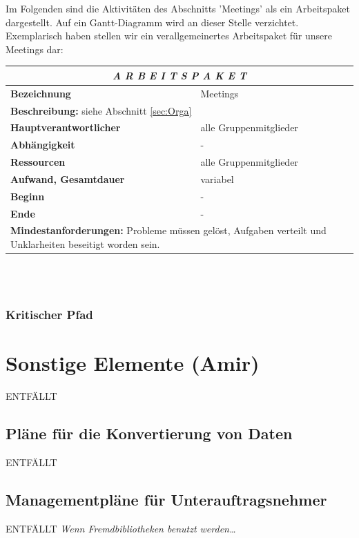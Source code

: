 \documentclass[fontsize=12pt,paper=a4,twoside]{scrartcl}
\begin{document}
Im Folgenden sind die Aktivitäten des Abschnitts 'Meetings' als ein Arbeitspaket dargestellt. Auf ein Gantt-Diagramm wird an dieser Stelle verzichtet.\\

Exemplarisch haben stellen wir ein verallgemeinertes Arbeitspaket für unsere Meetings dar: \\

\begin{tabular}{p{7.5cm}|p{7.5cm}}\toprule
\multicolumn{2}{c}{\textbf{\textit{A R B E I T S P A K E T \quad 8}}} \\ \toprule \hline
\textbf{Bezeichnung} & Meetings\\\hline
\multicolumn{2}{p{15cm}}{\textbf{Beschreibung:} \newline 
siehe Abschnitt \ref{sec:Orga}}  \\\hline
\textbf{Hauptverantwortlicher} & alle Gruppenmitglieder\\\hline
\textbf{Abhängigkeit} & -\\\hline
\textbf{Ressourcen} & alle Gruppenmitglieder\\\hline
\textbf{Aufwand, Gesamtdauer} & variabel  \\\hline
\textbf{Beginn} & - \\\hline
\textbf{Ende} & -\\\hline
\multicolumn{2}{p{15cm}}{\textbf{Mindestanforderungen: } Probleme müssen gelöst, Aufgaben verteilt und Unklarheiten beseitigt worden sein.  \newline
}  \\ \toprule
\end{tabular} \\\\ 

\subsubsection{Kritischer Pfad}\label{aps}

\section{Sonstige Elemente (Amir)}
ENTFÄLLT
\subsection{Pläne für die Konvertierung von Daten}
ENTFÄLLT

\subsection{Managementpläne für Unterauftragsnehmer}
ENTFÄLLT
{\em Wenn Fremdbibliotheken benutzt werden\dots}
\end{document}
